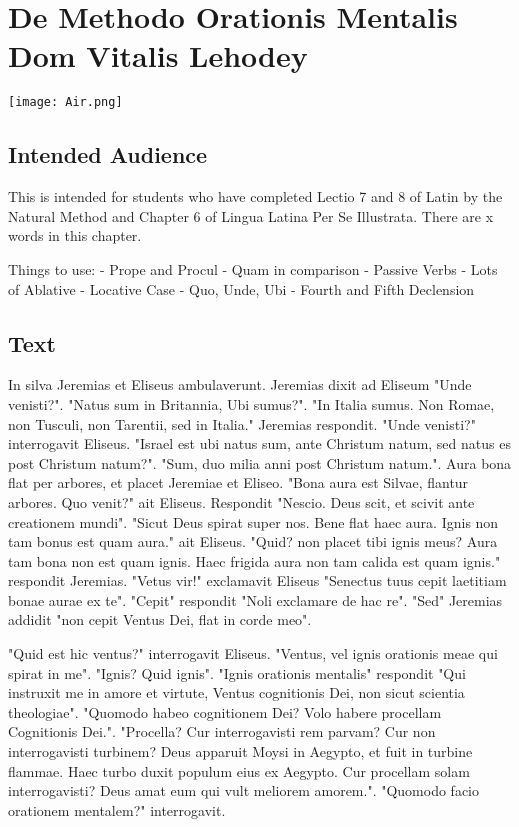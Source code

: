 \chapter{De Methodo Orationis Mentalis Dom Vitalis Lehodey}
\begin{center}
\texttt{[image: Air.png]}
\end{center}

\section{Intended Audience}
This is intended for students who have completed Lectio 7 and 8 of Latin by the Natural Method and Chapter 6 of Lingua Latina Per Se Illustrata. There are x words in this chapter.

Things to use:
	- Prope and Procul
	- Quam in comparison
	- Passive Verbs
	- Lots of Ablative
	- Locative Case 
	- Quo, Unde, Ubi
	- Fourth and Fifth Declension

\section{Text}
In silva Jeremias et Eliseus ambulaverunt. Jeremias dixit ad Eliseum "Unde venisti?". "Natus sum in Britannia, Ubi sumus?". "In Italia sumus. Non Romae, non Tusculi, non Tarentii, sed in Italia." Jeremias respondit. "Unde venisti?" interrogavit Eliseus. "Israel est ubi natus sum, ante Christum natum, sed natus es post Christum natum?". "Sum, duo milia anni post Christum natum.". Aura bona flat per arbores, et placet Jeremiae et Eliseo. "Bona aura est Silvae, flantur arbores.  Quo venit?" ait Eliseus. Respondit "Nescio. Deus scit, et scivit ante creationem mundi". "Sicut Deus spirat super nos.  Bene flat haec aura. Ignis non tam bonus est quam aura." ait Eliseus. "Quid? non placet tibi ignis meus? Aura tam bona non est quam ignis. Haec frigida aura non tam calida est quam ignis." respondit Jeremias. "Vetus vir!" exclamavit Eliseus "Senectus tuus cepit laetitiam bonae aurae ex te". "Cepit" respondit "Noli exclamare de hac re". "Sed" Jeremias addidit "non cepit Ventus Dei, flat in corde meo". 

"Quid est hic ventus?" interrogavit Eliseus. "Ventus, vel ignis orationis meae qui spirat in me". "Ignis? Quid ignis". "Ignis orationis mentalis" respondit "Qui instruxit me in amore et virtute, Ventus cognitionis Dei, non sicut scientia theologiae". "Quomodo habeo cognitionem Dei? Volo habere procellam Cognitionis Dei.". "Procella? Cur interrogavisti rem parvam? Cur non interrogavisti turbinem? Deus apparuit Moysi in Aegypto, et fuit in turbine flammae. Haec turbo duxit populum eius ex Aegypto. Cur procellam solam interrogavisti? Deus amat eum qui vult meliorem amorem.". "Quomodo facio orationem mentalem?" interrogavit. 

